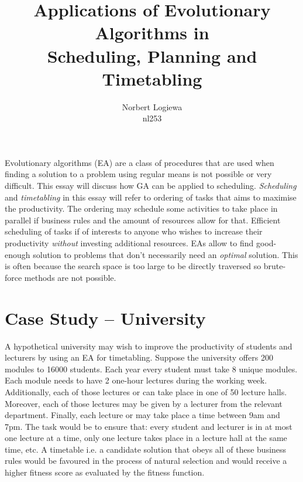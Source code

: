 \documentclass[a4paper, 12pt, titlepage]{article}
\date{} %
\author{Norbert Logiewa\\nl253}
\title{Applications of Evolutionary Algorithms in \\Scheduling, Planning and Timetabling}
\begin{document}
\maketitle

Evolutionary algorithms (EA) are a class of procedures that are used when
finding a solution to a problem using regular means is not possible
or very difficult.  This essay will discuss how GA can be applied
to scheduling.  \emph{Scheduling} and \emph{timetabling} in this essay
will refer to ordering of tasks that aims to maximise the productivity.
The ordering may schedule some activities to take place in parallel if
business rules and the amount of resources allow for that.  Efficient
scheduling of tasks if of interests to anyone who wishes to increase their
productivity \emph{without} investing additional resources.  EAs allow
to find good-enough solution to problems that don't necessarily need an
\emph{optimal} solution\cite[p.~44]{heaton2014}.  This is often because
the search space is too large to be directly traversed so brute-force
methods are not possible.


\section*{Case Study -- University}

A hypothetical university may wish to improve the productivity of students
and lecturers by using an EA for timetabling. Suppose the university
offers 200 modules to 16000 students. Each year every student must take 8
unique modules. Each module needs to have 2 one-hour lectures during the
working week. Additionally, each of those lectures or can take place in
one of 50 lecture halls. Moreover, each of those lectures may be given
by a lecturer from the relevant department.  Finally, each lecture or
may take place a time between 9am and 7pm.  The task would be to ensure
that: every student and lecturer is in at most one lecture at a time,
only one lecture takes place in a lecture hall at the same time, etc.
A timetable i.e. a candidate solution that obeys all of these business
rules would be favoured in the process of natural selection and would
receive a higher fitness score as evaluated by the fitness function.
\end{document}
